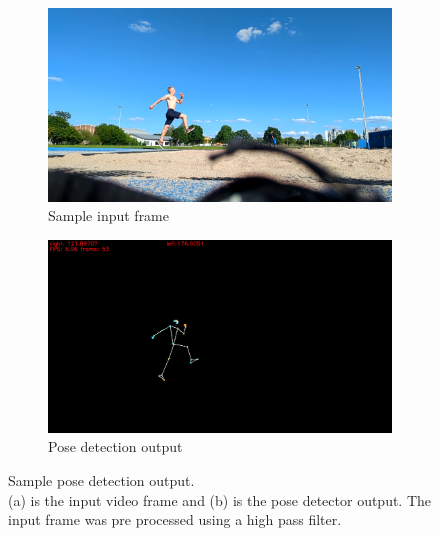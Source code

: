 \begin{figure}[h!]
    \begin{subfigure}[b]{0.47\textwidth}
        \includegraphics*[scale=0.1]{takeoff_good.png}
        \caption{Sample input frame}
        \label{subfig:input_frame}
    \end{subfigure}
    \hfill
    \begin{subfigure}[b]{0.5\textwidth}
        \includegraphics*[scale=0.185]{takeoff_keypoints.png}
        \caption{Pose detection output}
        \label{subfig:output_pose_detection_result}
    \end{subfigure}
    \caption[Pose detection example]{Sample pose detection output.\\
    (a) is the input video frame and (b) is the pose detector output.
    The input frame was pre processed using a high pass filter.}
    \label{fig:4_pose_detection_in_out}
\end{figure}

